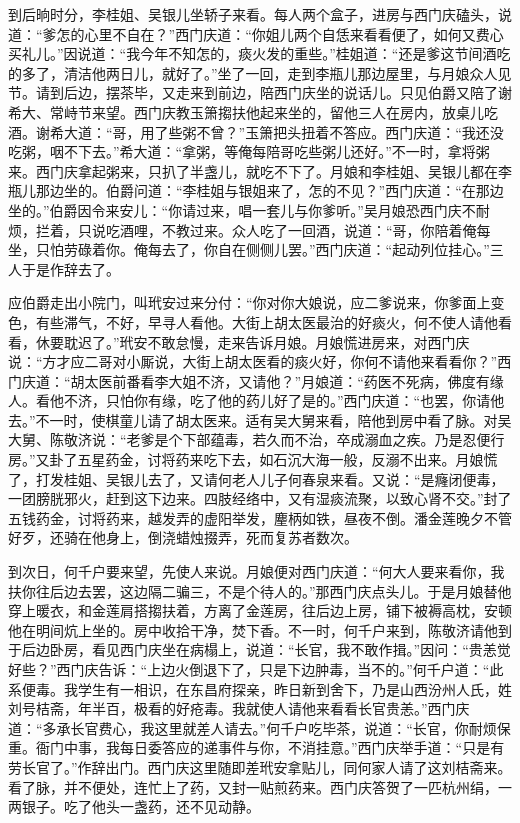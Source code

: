 到后晌时分，李桂姐、吴银儿坐轿子来看。每人两个盒子，进房与西门庆磕头，说道：“爹怎的心里不自在？”西门庆道：“你姐儿两个自恁来看看便了，如何又费心买礼儿。”因说道：“我今年不知怎的，痰火发的重些。”桂姐道：“还是爹这节间酒吃的多了，清洁他两日儿，就好了。”坐了一回，走到李瓶儿那边屋里，与月娘众人见节。请到后边，摆茶毕，又走来到前边，陪西门庆坐的说话儿。只见伯爵又陪了谢希大、常峙节来望。西门庆教玉箫搊扶他起来坐的，留他三人在房内，放桌儿吃酒。谢希大道：“哥，用了些粥不曾？”玉箫把头扭着不答应。西门庆道：“我还没吃粥，咽不下去。”希大道：“拿粥，等俺每陪哥吃些粥儿还好。”不一时，拿将粥来。西门庆拿起粥来，只扒了半盏儿，就吃不下了。月娘和李桂姐、吴银儿都在李瓶儿那边坐的。伯爵问道：“李桂姐与银姐来了，怎的不见？”西门庆道：“在那边坐的。”伯爵因令来安儿：“你请过来，唱一套儿与你爹听。”吴月娘恐西门庆不耐烦，拦着，只说吃酒哩，不教过来。众人吃了一回酒，说道：“哥，你陪着俺每坐，只怕劳碌着你。俺每去了，你自在侧侧儿罢。”西门庆道：“起动列位挂心。”三人于是作辞去了。

应伯爵走出小院门，叫玳安过来分付：“你对你大娘说，应二爹说来，你爹面上变色，有些滞气，不好，早寻人看他。大街上胡太医最治的好痰火，何不使人请他看看，休要耽迟了。”玳安不敢怠慢，走来告诉月娘。月娘慌进房来，对西门庆说：“方才应二哥对小厮说，大街上胡太医看的痰火好，你何不请他来看看你？”西门庆道：“胡太医前番看李大姐不济，又请他？”月娘道：“药医不死病，佛度有缘人。看他不济，只怕你有缘，吃了他的药儿好了是的。”西门庆道：“也罢，你请他去。”不一时，使棋童儿请了胡太医来。适有吴大舅来看，陪他到房中看了脉。对吴大舅、陈敬济说：“老爹是个下部蕴毒，若久而不治，卒成溺血之疾。乃是忍便行房。”又卦了五星药金，讨将药来吃下去，如石沉大海一般，反溺不出来。月娘慌了，打发桂姐、吴银儿去了，又请何老人儿子何春泉来看。又说：“是癃闭便毒，一团膀胱邪火，赶到这下边来。四肢经络中，又有湿痰流聚，以致心肾不交。”封了五钱药金，讨将药来，越发弄的虚阳举发，麈柄如铁，昼夜不倒。潘金莲晚夕不管好歹，还骑在他身上，倒浇蜡烛掇弄，死而复苏者数次。

到次日，何千户要来望，先使人来说。月娘便对西门庆道：“何大人要来看你，我扶你往后边去罢，这边隔二骗三，不是个待人的。”那西门庆点头儿。于是月娘替他穿上暖衣，和金莲肩搭搊扶着，方离了金莲房，往后边上房，铺下被褥高枕，安顿他在明间炕上坐的。房中收拾干净，焚下香。不一时，何千户来到，陈敬济请他到于后边卧房，看见西门庆坐在病榻上，说道：“长官，我不敢作揖。”因问：“贵恙觉好些？”西门庆告诉：“上边火倒退下了，只是下边肿毒，当不的。”何千户道：“此系便毒。我学生有一相识，在东昌府探亲，昨日新到舍下，乃是山西汾州人氏，姓刘号桔斋，年半百，极看的好疮毒。我就使人请他来看看长官贵恙。”西门庆道：“多承长官费心，我这里就差人请去。”何千户吃毕茶，说道：“长官，你耐烦保重。衙门中事，我每日委答应的递事件与你，不消挂意。”西门庆举手道：“只是有劳长官了。”作辞出门。西门庆这里随即差玳安拿贴儿，同何家人请了这刘桔斋来。看了脉，并不便处，连忙上了药，又封一贴煎药来。西门庆答贺了一匹杭州绢，一两银子。吃了他头一盏药，还不见动静。

